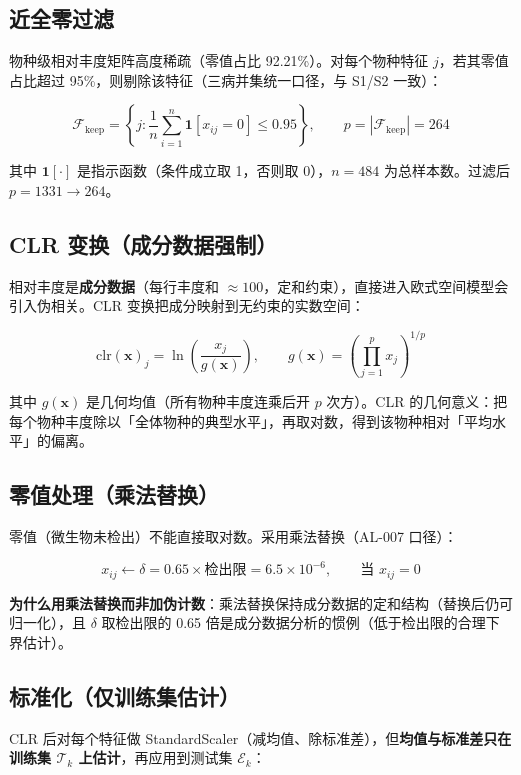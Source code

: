 \documentclass{internal-report}
\begin{document}
\subsection{近全零过滤}

物种级相对丰度矩阵高度稀疏（零值占比 92.21\%）。对每个物种特征 $j$，若其零值占比超过 95\%，则剔除该特征（三病并集统一口径，与 S1/S2 一致）：

$$
\mathcal{F}_{\text{keep}} = \left\{ j : \frac{1}{n}\sum_{i=1}^{n}\mathbf{1}[x_{ij}=0] \le 0.95 \right\}, \qquad p = |\mathcal{F}_{\text{keep}}| = 264
$$

其中 $\mathbf{1}[\cdot]$ 是指示函数（条件成立取 1，否则取 0），$n=484$ 为总样本数。过滤后 $p=1331\to264$。

\subsection{CLR 变换（成分数据强制）}

相对丰度是\textbf{成分数据}（每行丰度和 $\approx 100$，定和约束），直接进入欧式空间模型会引入伪相关。CLR 变换把成分映射到无约束的实数空间：

$$
\text{clr}(\mathbf{x})_j = \ln\left(\frac{x_j}{g(\mathbf{x})}\right), \qquad g(\mathbf{x}) = \left(\prod_{j=1}^{p} x_j\right)^{1/p}
$$

其中 $g(\mathbf{x})$ 是几何均值（所有物种丰度连乘后开 $p$ 次方）。CLR 的几何意义：把每个物种丰度除以「全体物种的典型水平」，再取对数，得到该物种相对「平均水平」的偏离。

\subsection{零值处理（乘法替换）}

零值（微生物未检出）不能直接取对数。采用乘法替换（AL-007 口径）：

$$
x_{ij} \leftarrow \delta = 0.65 \times \text{检出限} = 6.5\times10^{-6}, \qquad \text{当 } x_{ij}=0
$$

\textbf{为什么用乘法替换而非加伪计数}：乘法替换保持成分数据的定和结构（替换后仍可归一化），且 $\delta$ 取检出限的 0.65 倍是成分数据分析的惯例（低于检出限的合理下界估计）。

\subsection{标准化（仅训练集估计）}

CLR 后对每个特征做 StandardScaler（减均值、除标准差），但\textbf{均值与标准差只在训练集 $\mathcal{T}_k$ 上估计}，再应用到测试集 $\mathcal{E}_k$：
\end{document}
